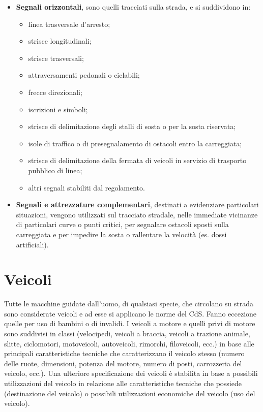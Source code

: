 \begin{itemize}
	      	\item \textbf{Segnali orizzontali}, sono quelli tracciati sulla strada, e si suddividono in:
	      	      \begin{itemize}
	      	      	\item linea trasversale d'arresto;
	      	      	\item strisce longitudinali;
	      	      	\item strisce trasversali;
	      	      	\item attraversamenti pedonali o ciclabili;
	      	      	\item frecce direzionali;
	      	      	\item iscrizioni e simboli;
	      	      	\item strisce di delimitazione degli stalli di sosta o per la sosta riservata;
	      	      	\item isole di traffico o di presegnalamento di ostacoli entro la carreggiata;
	      	      	\item strisce di delimitazione della fermata di veicoli in servizio di trasporto pubblico di linea;
	      	      	\item altri segnali stabiliti dal regolamento.
	      	      \end{itemize}
	      	      
	      	\item \textbf{Segnali e attrezzature complementari}, destinati a evidenziare particolari situazioni, vengono utilizzati sul tracciato stradale, nelle immediate vicinanze di particolari curve o punti critici, per segnalare ostacoli sposti sulla carreggiata e per impedire la sosta o rallentare la velocità (es. dossi artificiali).
	      \end{itemize}
	      
	      \section{Veicoli}
	      Tutte le macchine guidate dall'uomo, di qualsiasi specie, che circolano su strada sono considerate veicoli e ad esse si applicano le norme del CdS. Fanno eccezione quelle per uso di bambini o di invalidi.
	      I veicoli a motore e quelli privi di motore sono suddivisi in classi (velocipedi, veicoli a braccia, veicoli a trazione animale, slitte, ciclomotori, motoveicoli, autoveicoli, rimorchi, filoveicoli, ecc.) in base alle principali caratteristiche tecniche che caratterizzano il veicolo stesso (numero delle ruote, dimensioni, potenza del motore, numero di posti, carrozzeria del veicolo, ecc.).
	      Una ulteriore specificazione dei veicoli è stabilita in base a possibili utilizzazioni del veicolo in relazione alle caratteristiche tecniche che possiede (destinazione del veicolo) o possibili utilizzazioni economiche del veicolo (uso del veicolo).
	      
